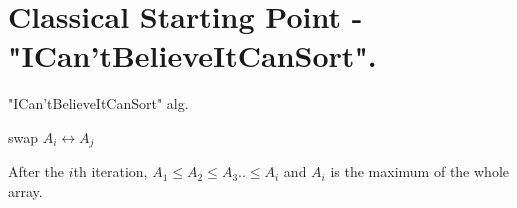 \documentclass[manuscript,screen,review]{acmart}
\begin{document}
\section{ Classical Starting Point - "ICan'tBelieveItCanSort".}

\begin{algorithm}
\SetAlgoLined
{}
\caption{ "ICan'tBelieveItCanSort"  alg.} \label{alg:alg1}
 {
   {
     {
      swap $A_{i} \leftrightarrow A_{j}$
    }
  }
}
\end{algorithm}
\begin{claim}
  \label{claim:first}
  After the $i$th iteration, $A_{1} \le A_{2} \le A_{3} .. \le A_{i}$ and $A_{i}$ is the maximum of the whole array. 
\end{claim}
\end{document}
